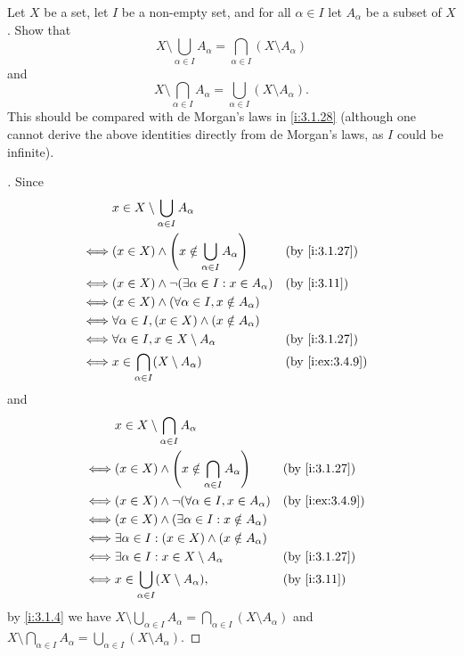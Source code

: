 \begin{ex}\label{i:ex:3.4.11}
  Let \(X\) be a set, let \(I\) be a non-empty set, and for all \(\alpha \in I\) let \(A_\alpha\) be a subset of \(X\).
  Show that
  \[
    X \setminus \bigcup_{\alpha \in I} A_\alpha = \bigcap_{\alpha \in I} (X \setminus A_\alpha)
  \]
  and
  \[
    X \setminus \bigcap_{\alpha \in I} A_\alpha = \bigcup_{\alpha \in I} (X \setminus A_\alpha).
  \]
  This should be compared with de Morgan's laws in \cref{i:3.1.28}
  (although one cannot derive the above identities directly from de Morgan's laws, as \(I\) could be infinite).
\end{ex}

\begin{proof}[]
  Since
  \begin{align*}
         & x \in X \setminus \bigcup_{\alpha \in I} A_\alpha                                  \\
    \iff & (x \in X) \land \pa{x \notin \bigcup_{\alpha \in I} A_\alpha} &  & \by{i:3.1.27}   \\
    \iff & (x \in X) \land \lnot(\exists \alpha \in I : x \in A_\alpha)  &  & \by{i:3.11}     \\
    \iff & (x \in X) \land (\forall \alpha \in I, x \notin A_\alpha)                          \\
    \iff & \forall \alpha \in I, (x \in X) \land (x \notin A_\alpha)                          \\
    \iff & \forall \alpha \in I, x \in X \setminus A_\alpha              &  & \by{i:3.1.27}   \\
    \iff & x \in \bigcap_{\alpha \in I} (X \setminus A_\alpha)           &  & \by{i:ex:3.4.9}
  \end{align*}
  and
  \begin{align*}
         & x \in X \setminus \bigcap_{\alpha \in I} A_\alpha                                  \\
    \iff & (x \in X) \land \pa{x \notin \bigcap_{\alpha \in I} A_\alpha} &  & \by{i:3.1.27}   \\
    \iff & (x \in X) \land \lnot(\forall \alpha \in I, x \in A_\alpha)   &  & \by{i:ex:3.4.9} \\
    \iff & (x \in X) \land (\exists \alpha \in I : x \notin A_\alpha)                         \\
    \iff & \exists \alpha \in I : (x \in X) \land (x \notin A_\alpha)                         \\
    \iff & \exists \alpha \in I : x \in X \setminus A_\alpha             &  & \by{i:3.1.27}   \\
    \iff & x \in \bigcup_{\alpha \in I} (X \setminus A_\alpha),          &  & \by{i:3.11}
  \end{align*}
  by \cref{i:3.1.4} we have \(X \setminus \bigcup_{\alpha \in I} A_\alpha = \bigcap_{\alpha \in I} (X \setminus A_\alpha)\) and \(X \setminus \bigcap_{\alpha \in I} A_\alpha = \bigcup_{\alpha \in I} (X \setminus A_\alpha)\).
\end{proof}
